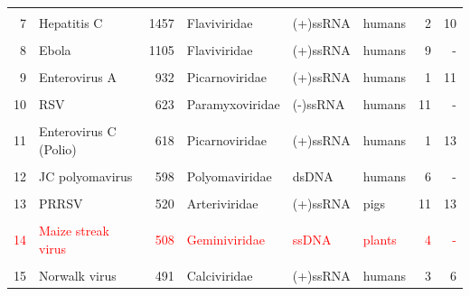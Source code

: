 \documentclass[landscape]{slides}
\begin{document}
\begin{slide}
\begin{center}
\begin{tabular}{r|l|r|l|l|l|r|r}
       &                    &              &                &          &        &       &          \\ 
     7 & Hepatitis C        &        1457  & Flaviviridae   & (+)ssRNA & humans &     2 &      10  \\
       &                    &              &                &          &        &       &          \\ 
     8 & Ebola              &        1105  & Flaviviridae   & (+)ssRNA & humans &     9 &       -  \\
       &                    &              &                &          &        &       &          \\ 
     9 & Enterovirus A      &         932  & Picarnoviridae & (+)ssRNA & humans &     1 &      11  \\
       &                    &              &                &          &        &       &          \\ 
    10 & RSV                &         623  & Paramyxoviridae& (-)ssRNA & humans &    11 &       -  \\
       &                    &              &                &          &        &       &          \\ 
    11 & Enterovirus C (Polio) &      618  & Picarnoviridae & (+)ssRNA & humans &     1 &      13  \\
       &                    &              &                &          &        &       &          \\ 
    12 & JC polyomavirus    &          598 & Polyomaviridae & dsDNA    & humans &     6 &       -  \\
       &                    &              &                &          &        &       &          \\ 
    13 & PRRSV              &          520 & Arteriviridae  & (+)ssRNA & pigs   &    11 &      13  \\ %
       &                    &              &                &          &        &       &          \\ 
    \textcolor{red}{14} & \textcolor{red}{Maize streak virus} &          \textcolor{red}{508} & \textcolor{red}{Geminiviridae}  & \textcolor{red}{ssDNA}    & \textcolor{red}{plants} &     \textcolor{red}{4} &      \textcolor{red}{-}   \\
       &                    &              &                &          &        &       &          \\ 
    15 & Norwalk virus      &          491 &  Calciviridae  & (+)ssRNA & humans &     3 &       6  \\ 
\end{tabular}

\end{center}

\vfill
\end{slide}
\end{document}
